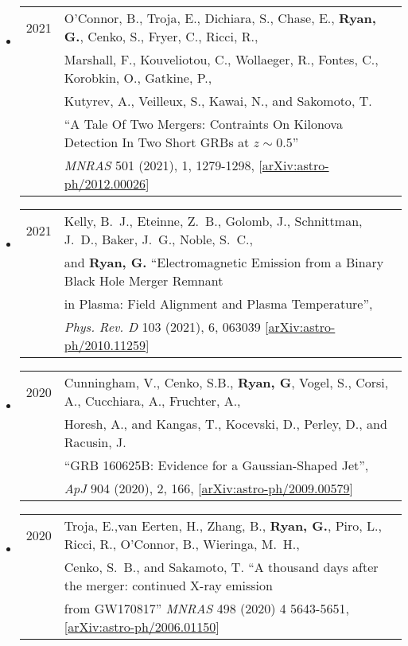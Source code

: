 \begin{itemize}
\item \begin{tabular}{ll}
2021 & {O'Connor}, B., {Troja}, E., {Dichiara}, S., {Chase}, E., {\bf {Ryan}, G.}, {Cenko}, S., {Fryer}, C., {Ricci}, R.,\\ 
	& {Marshall}, F., {Kouveliotou}, C., {Wollaeger}, R., {Fontes}, C., {Korobkin}, O., {Gatkine}, P.,\\
	&  {Kutyrev}, A., {Veilleux}, {S.}, {Kawai}, N., and {Sakomoto}, T. \\
	& ``A Tale Of Two Mergers: Contraints On Kilonova Detection In Two Short GRBs at $z\!\sim\!0.5$''\\
	& \emph{MNRAS} 501 (2021), 1, 1279-1298, [\href{https://arxiv.org/abs/2012.00026}{arXiv:astro-ph/2012.00026}]\\
\end{tabular}

\item \begin{tabular}{ll}
2021 & {Kelly}, B.~J., {Eteinne}, Z.~B., {Golomb}, J.,  {Schnittman}, J.~D., {Baker}, J.~G., {Noble}, S.~C.,\\
	& and {\bf {Ryan}, G.} ``Electromagnetic Emission from a Binary Black Hole Merger Remnant\\
	&  in Plasma: Field Alignment and Plasma Temperature'',\\
	& \emph{Phys. Rev. D} 103 (2021), 6, 063039 [\href{https://arxiv.org/abs/2010.11259}{arXiv:astro-ph/2010.11259}]
\end{tabular}

\item \begin{tabular}{ll}
2020 & {Cunningham}, V., {Cenko}, S.B., {\bf {Ryan}, G}, {Vogel}, S., {Corsi}, A., {Cucchiara}, A., {Fruchter}, A.,\\
	& {Horesh}, A., and {Kangas}, T., {Kocevski}, D., {Perley}, D., and {Racusin}, J. \\
	& ``GRB 160625B: Evidence for a Gaussian-Shaped Jet'',\\
	& \emph{ApJ} 904 (2020), 2, 166, [\href{https://arxiv.org/abs/2009.00579}{arXiv:astro-ph/2009.00579}]
\end{tabular}

\item \begin{tabular}{ll}
2020 & {Troja}, E.,{van Eerten}, H., {Zhang}, B., {\bf {Ryan}, G.}, {Piro}, L., {Ricci}, R., {O'Connor}, B., {Wieringa}, M.~H.,\\
	&  {Cenko}, S.~B., and {Sakamoto}, T.  ``A thousand days after the merger: continued X-ray emission\\
	&  from GW170817''  \emph{MNRAS} 498 (2020) 4 5643-5651, [\href{https://arxiv.org/abs/2006.01150}{arXiv:astro-ph/2006.01150}]
\end{tabular}


\end{itemize}
